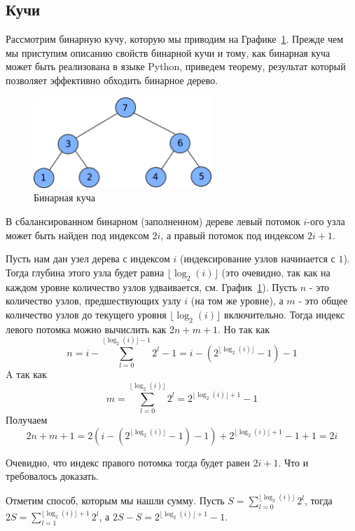 \subsection{Кучи}

Рассмотрим бинарную кучу, которую мы приводим на Графике~\ref{fig:binary_heap}.  
Прежде чем мы приступим описанию свойств бинарной кучи и тому, как бинарная куча может быть реализована в 
языке Python, приведем теорему, результат который позволяет эффективно обходить бинарное дерево. 

\begin{figure}
\centering
\includegraphics[width=0.6\textwidth]{graphics/binary_heap.png}
\caption{Бинарная куча}
\label{fig:binary_heap}
\end{figure}

\begin{theorem}
В сбалансированном бинарном (заполненном) дереве левый потомок $i$-ого узла может быть найден под 
индексом $2i$, а правый потомок под индексом $2i+1$.
\end{theorem}

Пусть нам дан узел дерева с индексом $i$ (индексирование узлов начинается с $1$). Тогда глубина этого узла 
будет равна $\lfloor \log_2(i) \rfloor$ (это очевидно, так как на каждом 
уровне количество узлов удваивается, см. График~\ref{fig:binary_heap}). Пусть $n$ - это количество узлов, 
предшествующих узлу $i$ (на том же уровне), а $m$ - это общее количество узлов
до текущего уровня $\lfloor \log_2(i) \rfloor$ включительно. Тогда индекс 
левого потомка можно вычислить как $2n + m+1$. Но так как
$$n = i - \sum_{l=0}^{\lfloor \log_2(i) \rfloor - 1} 2^l - 1 = i - (2^{\lfloor \log_2(i) \rfloor} - 1) - 1$$ 
A так как
$$m=\sum_{l=0}^{\lfloor \log_2(i) \rfloor} 2^l = 2^{\lfloor \log_2(i) \rfloor + 1} - 1$$
Получаем
$$2n+m+1= 2(i - (2^{\lfloor \log_2(i) \rfloor} - 1) - 1) + 2^{\lfloor \log_2(i) \rfloor + 1} - 1 + 1 = 2i$$ 

Очевидно, что индекс правого потомка тогда будет равен $2i+1$.
Что и требовалось доказать.

Отметим способ, которым мы нашли сумму. Пусть $S=\sum_{l=0}^{\lfloor \log_2(i) \rfloor} 2^l$, тогда 
$2S=\sum_{l=1}^{\lfloor \log_2(i) \rfloor + 1} 2^l$, а $2S-S = 2^{\lfloor \log_2(i) \rfloor + 1} - 1$.



